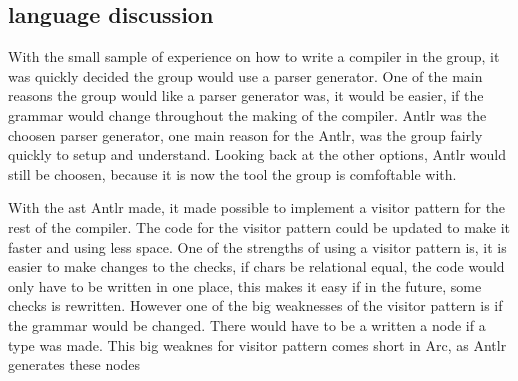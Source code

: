 \subsection*{language discussion}
With the small sample of experience on how to write a compiler in the group, it was quickly decided the group would use a parser generator. One of the main reasons the group would like a parser generator was, it would be easier, if the grammar would change throughout the making of the compiler. Antlr was the choosen parser generator, one main reason for the Antlr, was the group fairly quickly to setup and understand. Looking back at the other options, Antlr would still be choosen, because it is now the tool the group is comfoftable with.

With the \gls{ast} Antlr made, it made possible to implement a visitor pattern for the rest of the compiler. The code for the visitor pattern could be updated to make it faster and using less space. One of the strengths of using a visitor pattern is, it is easier to make changes to the checks, if chars be relational equal, the code would only have to be written in one place, this makes it easy if in the future, some checks is rewritten. However one of the big weaknesses of the visitor pattern is if the grammar would be changed. There would have to be a written a node if a type was made. This big weaknes for visitor pattern comes short in Arc, as Antlr generates these nodes